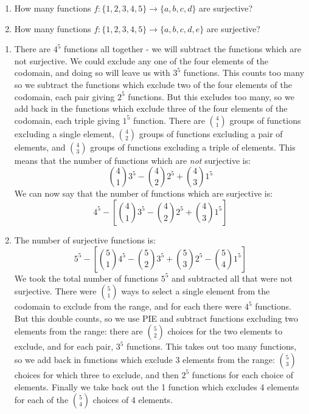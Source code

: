 \documentclass[12pt]{article}
\begin{document}
\begin{example}
  \begin{enumerate}
    \item How many functions $f: \{1,2,3,4,5\} \to \{a,b,c,d\}$ are surjective?
    \item How many functions $f: \{1,2,3,4,5\} \to \{a,b,c,d,e\}$ are surjective?
  \end{enumerate}
\begin{solution}
  \begin{enumerate}
    \item There are $4^5$ functions all together - we will subtract the functions which are not surjective.  We could exclude any one of the four elements of the codomain, and doing so will leave us with $3^5$ functions.  This counts too many so we subtract the functions which exclude two of the four elements of the codomain, each pair giving $2^5$ functions.  But this excludes too many, so we add back in the functions which exclude three of the four elements of the codomain, each triple giving $1^5$ function.  There are ${4 \choose 1}$ groups of functions excluding a single element, ${4 \choose 2}$ groups of functions excluding a pair of elements, and ${4 \choose 3}$ groups of functions excluding a triple of elements.  This means that the number of functions which are {\em not} surjective is:
    \[{4 \choose 1}3^5 - {4 \choose 2}2^5 + {4 \choose 3}1^5\]
    We can now say that the number of functions which are surjective is:
    \[4^5 - \left[{4 \choose 1}3^5 - {4 \choose 2}2^5 + {4 \choose 3}1^5\right]\]
    
    \item The number of surjective functions is:
    \[5^5 - \left[{5 \choose 1}4^5 - {5 \choose 2}3^5 + {5 \choose 3}2^5 - {5 \choose 4}1^5\right]\]
    We took the total number of functions $5^5$ and subtracted all that were not surjective.  There were ${5 \choose 1}$ ways to select a single element from the codomain to exclude from the range, and for each there were $4^5$ functions.  But this double counts, so we use PIE and subtract functions excluding two elements from the range: there are ${5 \choose 2}$ choices for the two elements to exclude, and for each pair, $3^5$ functions.  This takes out too many functions, so we add back in functions which exclude 3 elements from the range: ${5 \choose 3}$ choices for which three to exclude, and then $2^5$ functions for each choice of elements.  Finally we take back out the 1 function which excludes 4 elements for each of the ${5 \choose 4}$ choices of 4 elements.
  \end{enumerate}

\end{solution}

\end{example}
\end{document}

